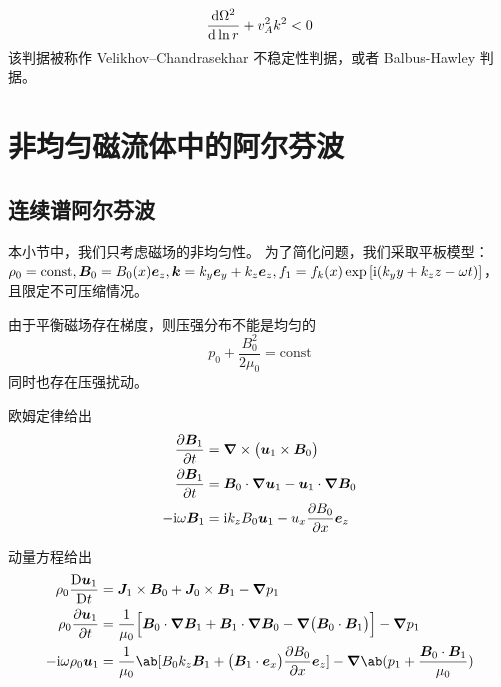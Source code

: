 \begin{equation}
\odv{\Omega^2}{\ln{r}} + v_A^2 k^2 < 0
\end{equation}
该判据被称作 Velikhov–Chandrasekhar 不稳定性判据，或者 Balbus-Hawley 判据。

\section{非均匀磁流体中的阿尔芬波}

\subsection{连续谱阿尔芬波}

本小节中，我们只考虑磁场的非均匀性。
为了简化问题，我们采取平板模型：
$\rho_0 = \text{const}, \bm{B}_0 = B_0(x) \bm{e}_z, \bm{k} = k_y \bm{e}_y + k_z \bm{e}_z, f_1 = f_k(x) \exp{[\mathrm{i}(k_y y + k_z z - \omega t)]}$，
且限定不可压缩情况。

由于平衡磁场存在梯度，则压强分布不能是均匀的
\begin{equation}
p_0 + \frac{B_0^2}{2 \mu_0} = \text{const}
\end{equation}
同时也存在压强扰动。

欧姆定律给出
\begin{equation}\begin{aligned}
\pdv{\bm{B}_1}{t} &= \bm{\nabla} \times{\big( \bm{u}_1 \times \bm{B}_0 \big)} \\
\pdv{\bm{B}_1}{t} &= \bm{B}_0 \cdot \bm{\nabla}{\bm{u}_1} - \bm{u}_1 \cdot \bm{\nabla}{\bm{B}_0} \\
- \mathrm{i} \omega \bm{B}_1 &= \mathrm{i} k_z B_0 \bm{u}_1 - u_x \pdv{B_0}{x} \bm{e}_z
\end{aligned}\end{equation}

动量方程给出
\begin{equation}\begin{aligned}
\rho_0 \mdv{\vec{u}_1}{t} &= \vec{J}_1 \times \vec{B}_0 + \vec{J}_0 \times \vec{B}_1 - \grad{p_1} \\
\rho_0 \pdv{\vec{u}_1}{t} &= \frac{1}{\mu_0} \Big[
    \vec{B}_0 \cdot \grad{\vec{B}_1}
    + \vec{B}_1 \cdot \grad{\vec{B}_0}
    - \grad{\big( \vec{B}_0 \cdot \vec{B}_1 \big) }
\Big] - \grad{p_1} \\
- \im \omega \rho_0 \vec{u}_1 &
= \frac{1}{\mu_0} \ab[
    B_0 k_z \vec{B}_1
    + \big( \vec{B}_1 \cdot \vec{e}_x \big) \pdv{B_0}{x} \vec{e}_z
] - \grad{\ab( p_1 + \frac{\vec{B}_0 \cdot \vec{B}_1}{\mu_0} )}
\end{aligned}\end{equation}

